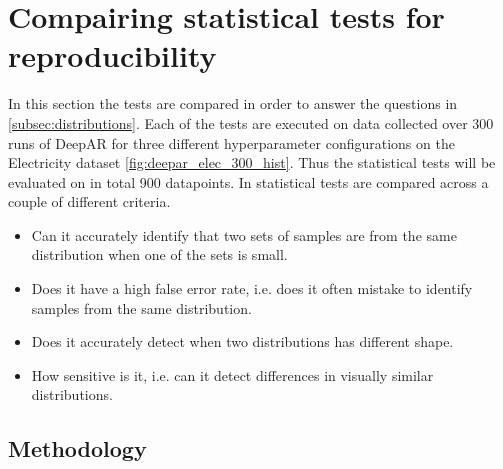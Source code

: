 \section{Compairing statistical tests for reproducibility}
\label{subsubsec:choosing-statistical-test}
In this section the tests are compared in order to answer the questions in \ref{subsec:distributions}. Each of the tests are executed on data collected over 300 runs of DeepAR for three different hyperparameter configurations on the Electricity dataset \ref{fig:deepar_elec_300_hist}. Thus the statistical tests will be evaluated on in total 900 datapoints. In statistical tests are compared across a couple of different criteria.  

\begin{itemize}
    \item Can it accurately identify that two sets of samples are from the same distribution when one of the sets is small.
    \item Does it have a high false error rate, i.e. does it often mistake to identify samples from the same distribution. 
    \item Does it accurately detect when two distributions has different shape.
    \item How sensitive is it, i.e. can it detect differences in visually similar distributions.
\end{itemize}

\subsection{Methodology}

